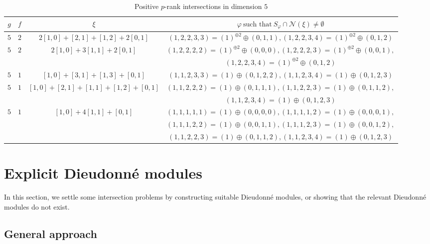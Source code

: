 \documentclass[11pt,table]{amsart}
\numberwithin{equation}{section}
\theoremstyle{definition}
\theoremstyle{remark}
\theoremstyle{remark}
\begin{document}
\begin{table}
    \begin{tabular}{|c|c|c|c|}
    \hline 
    $g$ & $ f$ & $\xi$ & $ \varphi \ \text{such that} \ S_{\varphi} \cap \mathcal{N}(\xi) \ne \emptyset$  \\
    \hline 
    $5$ & $2$ & $2[1,0] + [2,1] + [1,2] + 2[0,1]$ & $(1,2,2,3,3) = (1)^{\oplus 2} \oplus (0,1,1) , (1,2,2,3,4) = (1)^{\oplus 2} \oplus (0,1,2) $ \\
    \hline 
    $5$ & $2$ & $2[1,0] + 3[1,1] + 2[0,1]$ & $(1,2,2,2,2) = (1)^{\oplus 2} \oplus (0,0,0), (1,2,2,2,3) = (1)^{\oplus 2} \oplus (0,0,1), $ \\ & & & $ (1,2,2,3,4) = (1)^{\oplus 2} \oplus (0,1,2)$ \\ 
    \hline 
    $5$ & $1$ & $[1,0] + [3,1] + [1,3] + [0,1]$ & $(1,1,2,3,3) = (1) \oplus (0,1,2,2), (1,1,2,3,4) = (1) \oplus (0,1,2,3)$\\
    \hline 
    $5$ & $1$ & $[1,0] + [2,1] + [1,1] + [1,2] + [0,1]$ & $(1,1,2,2,2) = (1) \oplus (0,1,1,1), (1,1,2,2,3) = (1) \oplus (0,1,1,2),$ \\ & & & $(1,1,2,3,4) = (1) \oplus (0,1,2,3)$\\
    \hline 
    $5$ & $1$ & $[1,0] + 4[1,1] + [0,1]$ & $(1,1,1,1,1) = (1) \oplus (0,0,0,0),(1,1,1,1,2) = (1) \oplus
    (0,0,0,1),$ \\ & & & $(1,1,1,2,2) = (1) \oplus (0,0,1,1), (1,1,1,2,3) = (1) \oplus (0,0,1,2), $ \\
    & & & $(1,1,2,2,3) = (1) \oplus (0,1,1,2), (1,1,2,3,4) = (1) \oplus (0,1,2,3)$ \\
    \hline 
   \end{tabular}
      \caption{Positive $p$-rank intersections in dimension $5$}
    \label{positiveprank}
    \end{table}

\section{Explicit Dieudonn\'{e} modules} \label{sec: explicit}

In this section, we settle some intersection problems by constructing suitable Dieudonn\'{e} modules, or showing that the relevant Dieudonn\'{e} modules do not exist. 


\subsection{General approach} \label{ss: explicit general approach}
\end{document}
